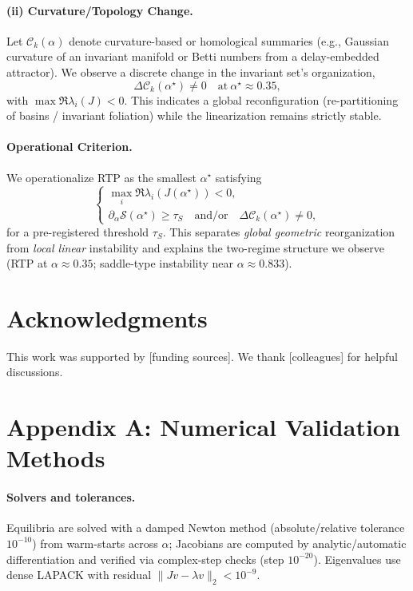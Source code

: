 \documentclass[11pt,twocolumn]{article}
\begin{document}
\paragraph{(ii) Curvature/Topology Change.}
Let $\mathcal{C}_k(\alpha)$ denote curvature-based or homological summaries (e.g., Gaussian curvature of an invariant manifold or Betti numbers from a delay-embedded attractor). We observe a discrete change in the invariant set's organization,
\[
\Delta \mathcal{C}_k(\alpha^\star)\neq 0\quad \text{at}\ \alpha^\star\approx 0.35,
\]
with $\max \Re\lambda_i(J)<0$. This indicates a global reconfiguration (re-partitioning of basins / invariant foliation) while the linearization remains strictly stable.

\paragraph{Operational Criterion.}
We operationalize RTP as the smallest $\alpha^\star$ satisfying
\[
\begin{cases}
\max\limits_i \Re\lambda_i(J(\alpha^\star)) < 0,\\[2pt]
\partial_\alpha \mathcal{S}(\alpha^\star) \ge \tau_S\quad \text{and/or}\quad \Delta \mathcal{C}_k(\alpha^\star)\neq 0,
\end{cases}
\]
for a pre-registered threshold $\tau_S$. This separates \emph{global geometric} reorganization from \emph{local linear} instability and explains the two-regime structure we observe (RTP at $\alpha\!\approx\!0.35$; saddle-type instability near $\alpha\!\approx\!0.833$).

\section*{Acknowledgments}

This work was supported by [funding sources]. We thank [colleagues] for helpful discussions.




\appendix

\section*{Appendix A: Numerical Validation Methods}
\label{app:numerics}

\paragraph{Solvers and tolerances.}
Equilibria are solved with a damped Newton method (absolute/relative tolerance $10^{-10}$) from warm-starts across $\alpha$; Jacobians are computed by analytic/automatic differentiation and verified via complex-step checks (step $10^{-20}$). Eigenvalues use dense LAPACK with residual $\|\!Jv-\lambda v\!\|_2 < 10^{-9}$.
\end{document}
